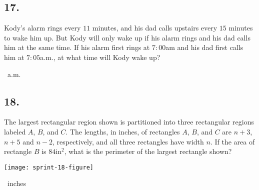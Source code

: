 \documentclass[12pt]{article}
\begin{document}
\subsection*{17.}
Kody's alarm rings every $11$ minutes, and his dad calls upstairs every $15$ minutes to wake him up. But Kody will only wake up if his alarm rings and his dad calls him at the same time. If his alarm first rings at $7{:}00$am and his dad first calls him at $7{:}05$a.m., at what time will Kody wake up?

\nopagebreak

\fbox{\phantom{ANSWER}}~a.m.

\begin{answer}
%
\end{answer}


\subsection*{18.}
The largest rectangular region shown is partitioned into three rectangular regions labeled $A$, $B$, and $C$. The lengths, in inches, of rectangles $A$, $B$, and $C$ are $n+3$, $n+5$ and $n-2$, respectively, and all three rectangles have width $n$. If the area of rectangle $B$ is $84$in$^2$, what is the perimeter of the largest rectangle shown?

\begin{minipagex}[b]{\linewidth}
\centering
\texttt{[image: sprint-18-figure]}
\end{minipagex}

\nopagebreak

\fbox{\phantom{ANSWER}}~inches
\end{document}
